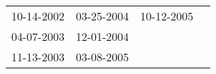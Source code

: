\begin{supertabular}{llll}
 10-14-2002 &  03-25-2004 &  10-12-2005 \\
 04-07-2003 &  12-01-2004 &             \\
 11-13-2003 &  03-08-2005 &             \\
\end{supertabular}
